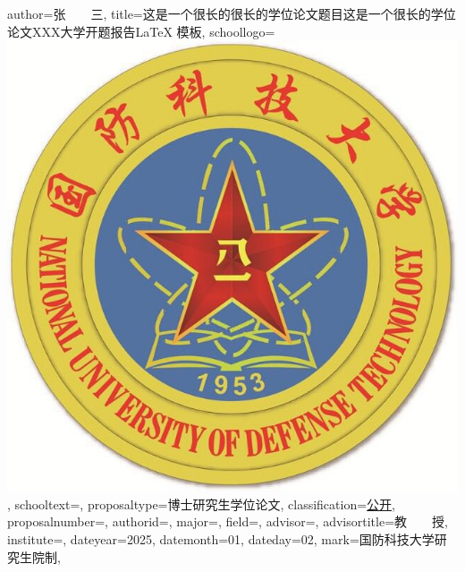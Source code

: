 \documentclass{NUDTproposal}
\begin{document}
\NUDTvalueset
{
    author={张~~~~三},                %
    title={这是一个很长的很长的学位论文题目这是一个很长的学位论文XXX大学开题报告\LaTeX{} 模板},                          %
    schoollogo={\includegraphics[scale=0.13]{nudt_logo_new}},
    schooltext={},
    proposaltype={博士研究生学位论文}, %
    classification={\underline{\qquad 公开\qquad}},          %
    proposalnumber={\underline{\makebox[3cm][c]{~~}}},  %
    authorid={},            %
    major={},         %
    field={},               %
    advisor={},               %
    advisortitle={教~~~~授},        %
    institute={}, %
    dateyear={2025},      %
    datemonth={01},      %
    dateday={02},      %
    mark={国防科技大学研究生院制},  %
}

\makecover



%
\clearpage

%
\clearpage

%
\clearpage

%
\clearpage
\end{document}
